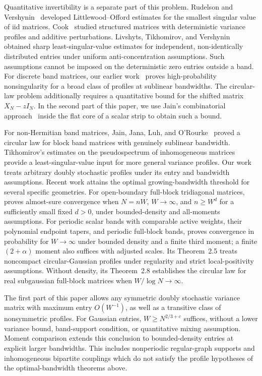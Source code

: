 \documentclass[11pt,reqno]{amsart}
\numberwithin{equation}{section}
\theoremstyle{plain}
\theoremstyle{definition}
\theoremstyle{remark}
\begin{document}
Quantitative invertibility is a separate part of this problem.
Rudelson and Vershynin~\cite{rudelson2008littlewood} developed
Littlewood--Offord estimates for the smallest singular value of iid
matrices. Cook~\cite{cook2018structured} studied structured matrices
with deterministic variance profiles and additive perturbations.
Livshyts, Tikhomirov, and Vershynin~\cite{livshyts2021} obtained sharp
least-singular-value estimates for independent, non-identically
distributed entries under uniform anti-concentration assumptions.
Such assumptions cannot be imposed on the deterministic zero entries
outside a band. For discrete band matrices, our earlier
work~\cite{han2025invertibility} proves high-probability nonsingularity
for a broad class of profiles at sublinear bandwidths. The circular-law
problem additionally requires a quantitative bound for the shifted
matrix $X_N-zI_N$. In the second part of this paper, we use Jain's
combinatorial approach~\cite{blsvJain} inside the flat core of a scalar
strip to obtain such a bound.

For non-Hermitian band matrices, Jain, Jana, Luh, and
O'Rourke~\cite{jain2021circular} proved a circular law for block band
matrices with genuinely sublinear bandwidth. Tikhomirov's estimates on
the pseudospectrum of inhomogeneous matrices~\cite{tikhomirov2023pseudospectrum}
provide a least-singular-value input for more general variance
profiles. Our work~\cite{han2024circular} treats arbitrary doubly
stochastic profiles under its entry and bandwidth assumptions.
Recent work attains the optimal growing-bandwidth threshold for several
specific geometries. For open-boundary full-block tridiagonal matrices,
\cite[Theorem~1.1]{han2025slow} proves almost-sure convergence when
$N=nW$, $W\to\infty$, and $n\ge W^d$ for a sufficiently small fixed
$d>0$, under bounded-density and all-moments assumptions.
For periodic scalar bands with comparable active weights, their
polynomial endpoint tapers, and periodic full-block bands,
\cite[Theorems~2.2, 2.10 and Corollary~2.4]{han2026optimal} proves
convergence in probability for $W\to\infty$ under bounded density and
a finite third moment; a finite $(2+\alpha)$ moment also suffices with
adjusted scales. Its Theorem~2.5 treats noncompact circular-Gaussian
profiles under regularity and strict local-positivity assumptions.
Without density, its Theorem~2.8 establishes the circular law for real
subgaussian full-block matrices when $W/\log N\to\infty$.

The first part of this paper allows any symmetric doubly stochastic
variance matrix with maximum entry $O(W^{-1})$, as well as a transitive
class of nonsymmetric profiles.
For Gaussian entries, $W\ge N^{2/3+c}$ suffices, without a lower variance
bound, band-support condition, or quantitative mixing assumption.
Moment comparison extends this conclusion to bounded-density entries
at explicit larger bandwidths. This includes nonperiodic regular-graph supports and inhomogeneous
bipartite couplings which do not satisfy the profile
hypotheses of the optimal-bandwidth theorems above.
\end{document}
